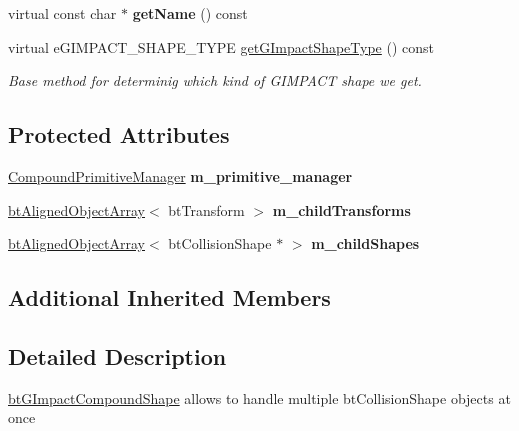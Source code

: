 \begin{DoxyCompactItemize}
\mbox{\label{classbtGImpactCompoundShape_a5d5b8c3c0e0e7542fd3a71271c97619f}} 
virtual const char $\ast$ {\bfseries get\+Name} () const
\item 
virtual e\+G\+I\+M\+P\+A\+C\+T\+\_\+\+S\+H\+A\+P\+E\+\_\+\+T\+Y\+PE \hyperlink{classbtGImpactCompoundShape_a6f75f32671f5555df85d4efd342c1c67}{get\+G\+Impact\+Shape\+Type} () const
\begin{DoxyCompactList}\small\item\em Base method for determinig which kind of G\+I\+M\+P\+A\+CT shape we get. \end{DoxyCompactList}\end{DoxyCompactItemize}
\subsection*{Protected Attributes}
\begin{DoxyCompactItemize}
\item 
\mbox{\label{classbtGImpactCompoundShape_ae4ad14e04e69e88634f9811973a39109}} 
\hyperlink{classbtGImpactCompoundShape_1_1CompoundPrimitiveManager}{Compound\+Primitive\+Manager} {\bfseries m\+\_\+primitive\+\_\+manager}
\item 
\mbox{\label{classbtGImpactCompoundShape_a850512ffb3a1cdda6073317ea4bf1944}} 
\hyperlink{classbtAlignedObjectArray}{bt\+Aligned\+Object\+Array}$<$ bt\+Transform $>$ {\bfseries m\+\_\+child\+Transforms}
\item 
\mbox{\label{classbtGImpactCompoundShape_af1488633ecb9ae646bd92d520b564bc9}} 
\hyperlink{classbtAlignedObjectArray}{bt\+Aligned\+Object\+Array}$<$ bt\+Collision\+Shape $\ast$ $>$ {\bfseries m\+\_\+child\+Shapes}
\end{DoxyCompactItemize}
\subsection*{Additional Inherited Members}


\subsection{Detailed Description}
\hyperlink{classbtGImpactCompoundShape}{bt\+G\+Impact\+Compound\+Shape} allows to handle multiple bt\+Collision\+Shape objects at once 

